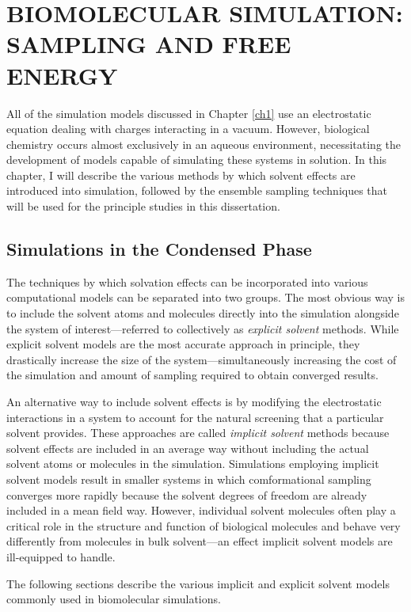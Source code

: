\chapter{BIOMOLECULAR SIMULATION: SAMPLING AND FREE ENERGY}
\label{ch2}

All of the simulation models discussed in Chapter \ref{ch1} use an electrostatic
equation dealing with charges interacting in a vacuum. However, biological
chemistry occurs almost exclusively in an aqueous environment, necessitating the
development of models capable of simulating these systems in solution.  In this
chapter, I will describe the various methods by which solvent effects are
introduced into simulation, followed by the ensemble sampling techniques that
will be used for the principle studies in this dissertation.

\section{Simulations in the Condensed Phase}

The techniques by which solvation effects can be incorporated into various
computational models can be separated into two groups. The most obvious way is
to include the solvent atoms and molecules directly into the simulation
alongside the system of interest---referred to collectively as \emph{explicit
solvent} methods. While explicit solvent models are the most accurate approach
in principle, they drastically increase the size of the system---simultaneously
increasing the cost of the simulation and amount of sampling required to obtain
converged results.

An alternative way to include solvent effects is by modifying the electrostatic
interactions in a system to account for the natural screening that a particular
solvent provides. These approaches are called \emph{implicit solvent} methods
because solvent effects are included in an average way without including the
actual solvent atoms or molecules in the simulation. Simulations employing
implicit solvent models result in smaller systems in which comformational
sampling converges more rapidly because the solvent degrees of freedom are
already included in a mean field way. However, individual solvent molecules
often play a critical role in the structure and function of biological molecules
and behave very differently from molecules in bulk solvent---an effect implicit
solvent models are ill-equipped to handle.

The following sections describe the various implicit and explicit solvent models
commonly used in biomolecular simulations.

